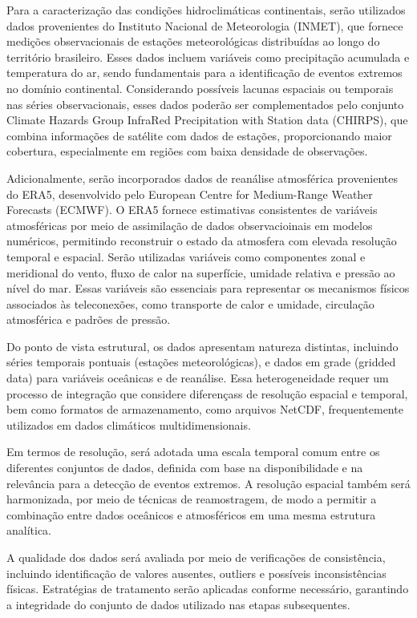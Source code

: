 	Para a caracterização das condições hidroclimáticas continentais, serão utilizados dados provenientes do Instituto Nacional de Meteorologia (INMET), que fornece medições observacionais de estações meteorológicas distribuídas ao longo do território brasileiro.
	Esses dados incluem variáveis como precipitação acumulada e temperatura do ar, sendo fundamentais para a identificação de eventos extremos no domínio continental.
	Considerando possíveis lacunas espaciais ou temporais nas séries observacionais, esses dados poderão ser complementados pelo conjunto Climate Hazards Group InfraRed Precipitation with Station data (CHIRPS), que combina informações de satélite com dados de estações, proporcionando maior cobertura, especialmente em regiões com baixa densidade de observações.

	Adicionalmente, serão incorporados dados de reanálise atmosférica provenientes do ERA5, desenvolvido pelo European Centre for Medium-Range Weather Forecasts (ECMWF). 
	O ERA5 fornece estimativas consistentes de variáveis atmosféricas por meio de assimilação de dados observacioinais em modelos numéricos, permitindo reconstruir o estado da atmosfera com elevada resolução temporal e espacial.
	Serão utilizadas variáveis como componentes zonal e meridional do vento, fluxo de calor na superfície, umidade relativa e pressão ao nível do mar.
	Essas variáveis são essenciais para representar os mecanismos físicos associados às teleconexões, como transporte de calor e umidade, circulação atmosférica e padrões de pressão.

	Do ponto de vista estrutural, os dados apresentam natureza distintas, incluindo séries temporais pontuais (estações meteorológicas), e dados em grade (gridded data) para variáveis oceânicas e de reanálise.
	Essa heterogeneidade requer um processo de integração que considere diferençass de resolução espacial e temporal, bem como formatos de armazenamento, como arquivos NetCDF, frequentemente utilizados em dados climáticos multidimensionais.

	Em termos de resolução, será adotada uma escala temporal comum entre os diferentes conjuntos de dados, definida com base na disponibilidade e na relevância para a detecção de eventos extremos.
	A resolução espacial também será harmonizada, por meio de técnicas de reamostragem, de modo a permitir a combinação entre dados oceânicos e atmosféricos em uma mesma estrutura analítica.

	A qualidade dos dados será avaliada por meio de verificações de consistência, incluindo identificação de valores ausentes, outliers e possíveis inconsistências físicas. 
	Estratégias de tratamento serão aplicadas conforme necessário, garantindo a integridade do conjunto de dados utilizado nas etapas subsequentes.

